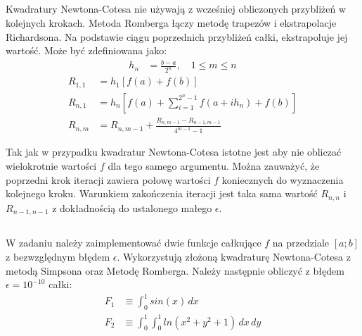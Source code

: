 \documentclass[11pt]{extarticle}
\begin{document}
	\subsection{}
	Kwadratury Newtona-Cotesa nie używają z wcześniej obliczonych przybliżeń w kolejnych krokach.
	Metoda Romberga łączy metodę trapezów i ekstrapolacje Richardsona.
	Na podstawie ciągu poprzednich przybliżeń całki, ekstrapoluje jej wartość. 
	Może być zdefiniowana jako:
	\begin{align}
		h_n &= \frac{b-a}{2^n}, \quad 1 \leq m \leq n
	\end{align}
	\begin{align}
		R_{1,1} &= h_1 \left[ f(a) + f(b) \right] \\[0.3cm]
		R_{n,1} &= h_n \left[ f(a) + \sum_{i=1}^{2^n-1}f(a + ih_n) + f(b) \right] \\[0.3cm]
		R_{n,m} &= R_{n,m-1} + \frac{R_{n,m-1} - R_{n-1,m-1}}{4^{m-1} - 1}
	\end{align}

	Tak jak w przypadku kwadratur Newtona-Cotesa istotne jest aby nie obliczać wielokrotnie wartości \(f\) dla tego samego argumentu.
	Można zauważyć, że poprzedni krok iteracji zawiera połowę wartości \(f\) koniecznych do wyznaczenia kolejnego kroku.
	Warunkiem zakończenia iteracji jest taka sama wartość \(R_{n,n}\) i \(R_{n-1, n-1}\) z dokładnością do ustalonego małego \(\epsilon\).

	\subsection{}
	W zadaniu należy zaimplementować dwie funkcje całkujące \(f\) na przedziale \([a;b]\) z bezwzględnym błędem \(\epsilon\).
	Wykorzystują złożoną kwadraturę Newtona-Cotesa z metodą Simpsona oraz Metodę Romberga.
	Należy następnie obliczyć z błędem \(\epsilon = 10^{-10}\) całki:
	\begin{align}
		F_1 &\equiv \int_0^1 sin(x)\,dx \\
		F_2 &\equiv \int_0^1 \int_0^1 ln(x^2 + y^2 + 1)\,dx\,dy
	\end{align}
\end{document}
